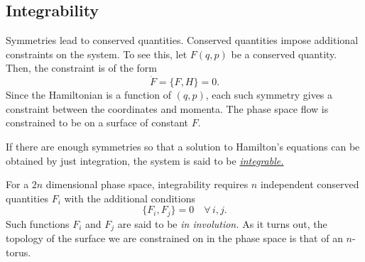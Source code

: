 \documentclass{article}
\begin{document}
\subsection{Integrability}
Symmetries lead to conserved quantities. Conserved quantities impose additional constraints on the system. To see this, let $ F(q,p) $ be a conserved quantity. Then, the constraint is of the form
\[
\dot{F} = \{F, H\} = 0.
\]
Since the Hamiltonian is a function of $ (q,p) $, each such symmetry gives a constraint between the coordinates and momenta. The phase space flow is constrained to be on a surface of constant $ F $. 
\par
If there are enough symmetries so that a solution to Hamilton's equations can be obtained by just integration, the system is said to be \href{https://en.wikipedia.org/wiki/Integrable_system#Hamiltonian_systems_and_Liouville_integrability}{\textit{integrable.}}
\par
For a $ 2n $ dimensional phase space, integrability requires $ n $ independent conserved quantities $ F_{i} $ with the additional conditions
\[
	\{F_{i}, F_{j}\} = 0 \quad \forall \, i,j.
\]
Such functions $ F_{i} $ and $ F_{j} $ are said to be \textit{in involution.} As it turns out, the topology of the surface we are constrained on in the phase space is that of an $ n $-torus.
\end{document}
